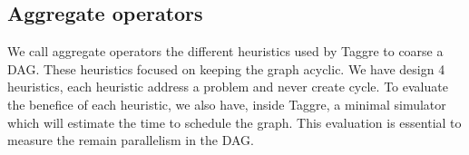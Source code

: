 \subsection{Aggregate operators}
We call aggregate operators the different heuristics used by Taggre to coarse a DAG.
%
These heuristics focused on keeping the graph acyclic.
%
We have design 4 heuristics, each heuristic address a problem and never create cycle.
%
To evaluate the benefice of each heuristic, we also have, inside Taggre, a minimal simulator which will estimate the time to schedule the graph.
%
This evaluation is essential to measure the remain parallelism in the DAG.

